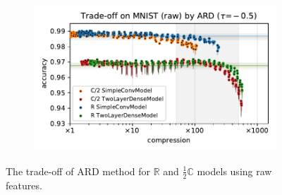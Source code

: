 \documentclass[a4paper,10pt,onecolumn]{article}
\newcommand{\real}{\mathbb{R}}
\newcommand{\cplx}{\mathbb{C}}
\begin{document}
\begin{figure}[b]
\begin{subfigure}[b]{0.5\columnwidth}
  \end{subfigure}%
  \begin{subfigure}[b]{0.5\columnwidth}
    \centering
    \includegraphics[width=\linewidth]{figure__mnist-like__trade-off/appendix__cmp__ARD__mnist__raw__-0.5.pdf}
  \end{subfigure}
  \caption{%
    The trade-off of ARD method for $\real$ and $\tfrac12\cplx$ models using raw features.
  }
  \label{fig:appendix__cmp__mnist-like__trade-off__ARD__raw}
\end{figure}
\end{document}
